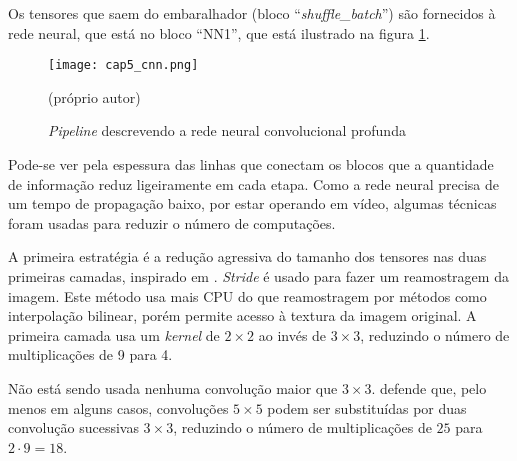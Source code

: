 Os tensores que saem do embaralhador (bloco ``\emph{shuffle\_batch}'') são
fornecidos à rede neural, que está no
bloco ``NN1'', que está ilustrado na figura \ref{fig:cap5_cnn}.

\begin{figure}[!htb]
	\centering
	\texttt{[image: cap5\_cnn.png]}
	\caption{\emph{Pipeline} descrevendo a rede neural convolucional profunda}
	\label{fig:cap5_cnn}
	(próprio autor)
\end{figure}

Pode-se ver pela espessura das linhas que conectam os blocos que a quantidade
de informação reduz ligeiramente em cada etapa. Como a rede neural precisa
de um tempo de propagação baixo, por estar operando em vídeo, algumas técnicas
foram usadas para reduzir o número de computações.

A primeira estratégia é a redução agressiva do tamanho dos tensores nas duas
primeiras camadas, inspirado em \cite{szegedy2015going}. \emph{Stride} é usado
para fazer um reamostragem da imagem. Este método usa mais CPU do que
reamostragem por métodos como interpolação bilinear, porém permite acesso
à textura da imagem original. A
primeira camada usa um \emph{kernel} de $2 \times 2$ ao invés de $3 \times 3$,
reduzindo o número de multiplicações de 9 para 4.

Não está sendo usada nenhuma convolução maior que $3 \times 3$.
 defende que, pelo menos em alguns casos,
convoluções $5 \times 5$ podem ser substituídas por duas convolução
sucessivas $3 \times 3$, reduzindo o número de
multiplicações de $25$ para $2 \cdot 9=18$.

